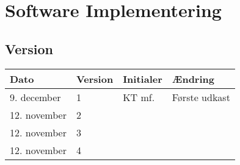 \chapter{Software Implementering}\label{ch:sw_impl}
\section*{Version}
\begin{table}[h]
	\centering
	\begin{tabularx}{\textwidth - 2cm}{|l|l|l|X|}
	\hline
	Dato			& Version			& Initialer 		& Ændring										\\ \hline
	9. december		& 1 				& KT mf.	 		& Første udkast			\\ \hline
	12. november	& 2 				& 			 		& 			\\ \hline
	12. november	& 3 				& 			 		& 			\\ \hline
	12. november	& 4 				& 			 		& 			\\ \hline
	\end{tabularx}
\end{table}
\clearpage

